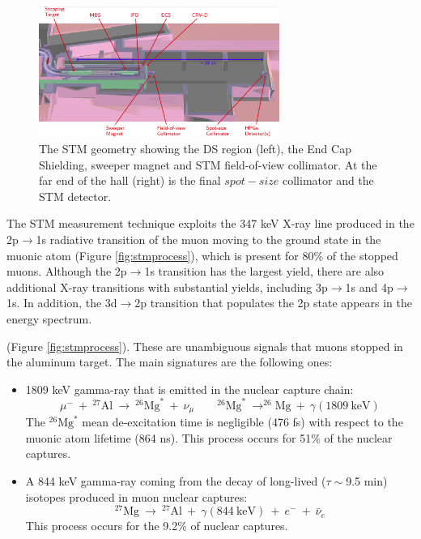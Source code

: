 \begin{figure}[!h]
    \centering
    \includegraphics[width =0.7\textwidth]{figures/png/Screenshot_20240306_180910.png}
    \caption[The Stopping Target Monitor geometry.]{The STM geometry showing the DS region (left), 
    the End Cap Shielding, sweeper magnet and STM field-of-view collimator. 
    At the far end of the hall (right) is the final $spot-size$ collimator and the STM detector.}
    \label{fig:stm}
    \end{figure}
    The STM measurement technique exploits the 347 keV X-ray line produced in the 2p$\rightarrow$1s 
    radiative transition of the muon moving to the ground state in the muonic atom (Figure \ref{fig:stmprocess}), 
    which is present for 80\% of the stopped muons. Although the 2p$\rightarrow$1s transition has the 
    largest yield, there are also additional X-ray transitions with substantial yields, 
    including 3p$\rightarrow$1s and 4p$\rightarrow$1s. In addition, the 3d$\rightarrow$2p 
    transition that populates the 2p state appears in the energy spectrum.

(Figure \ref{fig:stmprocess}).
    These are unambiguous signals that muons stopped in the aluminum target. 
    The main signatures are the following ones: 
    \begin{itemize}
    \item 1809 keV gamma-ray that is emitted in the nuclear capture chain:
    \begin{equation}
        \mu^- \ + \ ^{27}\text{Al} \ \rightarrow \ ^{26}\text{Mg}^* \ + \ \nu_\mu \quad \quad ^{26}\text{Mg}^* \ \rightarrow ^{26}\text{Mg} \ + \ \gamma(1809 \ \text{keV})
     \end{equation}
     The $^{26}\text{Mg}^*$ mean de-excitation time is negligible (476 fs) with 
     respect to the muonic atom lifetime (864 ns). 
     This process occurs for 51\% of the nuclear captures.
     \item  A 844 keV gamma-ray coming from the decay of 
       long-lived ($\tau \sim$9.5 min) isotopes produced in muon nuclear captures:       
     \begin{equation}
        ^{27}\text{Mg} \ \rightarrow \ ^{27}\text{Al} \ + \ \gamma(844 \ \text{keV}) \ + \ e^- \ + \ \bar{\nu}_e
     \end{equation}
     This process occurs for the 9.2\% of nuclear captures.
\end{itemize}

